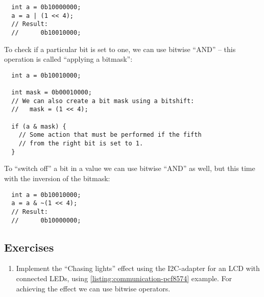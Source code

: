 \documentclass[../sparc.tex]{subfiles}
\begin{document}
\begin{verbatim}
  int a = 0b10000000;
  a = a | (1 << 4);
  // Result:
  //      0b10010000;
\end{verbatim}

To check if a particular bit is set to one, we can use bitwise ``AND'' -- this
operation is called ``applying a bitmask'':

\begin{verbatim}
  int a = 0b10010000;

  int mask = 0b00010000;
  // We can also create a bit mask using a bitshift:
  //   mask = (1 << 4);

  if (a & mask) {
    // Some action that must be performed if the fifth
    // from the right bit is set to 1.
  }
\end{verbatim}

To ``switch off'' a bit in a value we can use bitwise ``AND'' as well, but this
time with the inversion of the bitmask:

\begin{verbatim}
  int a = 0b10010000;
  a = a & ~(1 << 4);
  // Result:
  //      0b10000000;
\end{verbatim}

\subsection{Exercises}

\begin{enumerate}
\item Implement the ``Chasing lights'' effect using the I2C-adapter for an LCD
  with connected LEDs, using \ref{listing:communication-pcf8574} example.  For
  achieving the effect we can use bitwise operators.
\end{enumerate}
\end{document}
